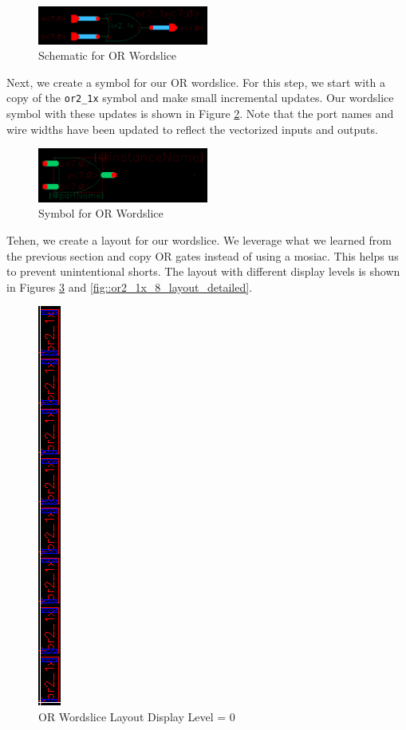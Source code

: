 \documentclass{article}
\begin{document}
	\begin{figure}[H]
		\centerline{\includegraphics[width=0.5\textwidth]{or2_1x_8_schematic.png}}
		\caption{Schematic for OR Wordslice}
		\label{fig::or2_1x_8_schematic}
	\end{figure}
	
	\noindent Next, we create a symbol for our OR wordslice. For this step, we start with a copy of the \texttt{or2\_1x} symbol and make small incremental updates. Our wordslice symbol with these updates is shown in Figure \ref{fig::or2_1x_8_symbol}. Note that the port names and wire widths have been updated to reflect the vectorized inputs and outputs.
	
	\begin{figure}[H]
		\centerline{\includegraphics[width=0.5\textwidth]{or2_1x_8_symbol.png}}
		\caption{Symbol for OR Wordslice}
		\label{fig::or2_1x_8_symbol}
	\end{figure}
	
	\noindent Tehen, we create a layout for our wordslice. We leverage what we learned from the previous section and copy OR gates instead of using a mosiac. This helps us to prevent unintentional shorts. The layout with different display levels is shown in Figures \ref{fig::or2_1x_8_layout_overview} and \ref{fig::or2_1x_8_layout_detailed}.
	
	\begin{figure}[H]
		\centerline{\includegraphics[height=0.8\textwidth, angle=270]{or2_1x_8_layout_overview.png}}
		\caption{OR Wordslice Layout Display Level = 0}
		\label{fig::or2_1x_8_layout_overview}
	\end{figure}
	
\end{document}
